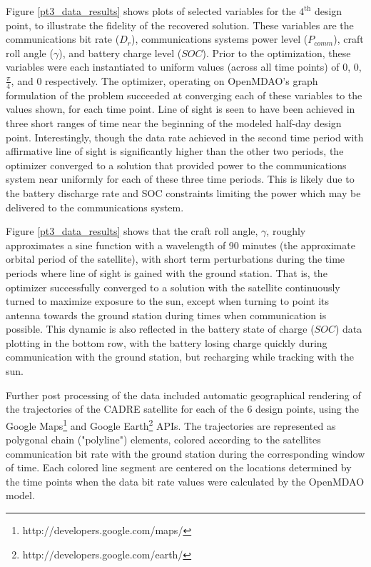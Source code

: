 \documentclass[]{aiaa-tc} %
\begin{document}
    Figure \ref{pt3_data_results} shows plots of selected variables for the $4^{\textrm{th}}$ design point,
    to illustrate the fidelity of the recovered solution. These variables are the communications
    bit rate ($D_r$), communications systems power level ($P_{comm}$), craft roll angle ($\gamma$),
    and battery charge level ($SOC$). Prior to the optimization, these variables
    were each instantiated to uniform values
    (across all time points) of 0, 0, $\frac{\pi}{4}$, and 0 respectively. The optimizer, operating on
    OpenMDAO's graph formulation of the problem succeeded at converging each of these variables to the values
    shown, for each time point. Line of sight is seen to have been achieved in three short ranges of time near the
    beginning of the modeled half-day design point. Interestingly, though the data rate achieved in the second
    time period with affirmative line of sight is significantly higher than the other two periods, the optimizer
    converged to a solution that provided power to the communications system near uniformly for each of these
    three time periods. This is likely due to the battery discharge rate and SOC constraints limiting
    the power which may be delivered to the communications system.

    Figure \ref{pt3_data_results} shows that the craft roll angle, $\gamma$, roughly approximates a sine function
    with a wavelength of 90 minutes (the approximate orbital period of the satellite),
    with short term perturbations during the time
    periods where line of sight is gained with the ground station. That is, the optimizer successfully
    converged to a solution with the satellite continuously turned to maximize exposure to the sun,
    except when turning to point its antenna towards the ground station during times when
    communication is possible. This dynamic is also reflected in the battery state of charge ($SOC$)
    data plotting in the bottom row, with the battery losing charge quickly during
    communication with the ground station, but recharging while tracking with the sun.

    Further post processing of the data included automatic geographical rendering of the trajectories of
    the CADRE satellite for each of the 6 design points, using the Google
    Maps\footnote{http://developers.google.com/maps/} and Google
    Earth\footnote{http://developers.google.com/earth/} APIs. The trajectories are
    represented as polygonal chain ("polyline") elements, colored according to the
    satellites communication bit rate with the ground station during the corresponding
    window of time. Each colored line segment are centered on the locations
    determined by the time points when the data bit rate values were calculated
    by the OpenMDAO model.
\end{document}

